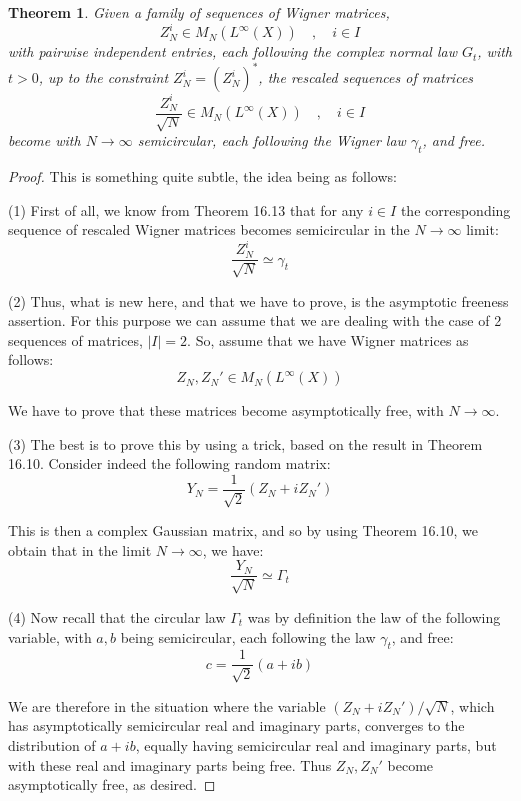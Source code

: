 \documentclass[12pt]{amsbook}
\newtheorem{theorem}{Theorem}[chapter]
\begin{document}

\begin{theorem}
Given a family of sequences of Wigner matrices, 
$$Z^i_N\in M_N(L^\infty(X))\quad,\quad i\in I$$
with pairwise independent entries, each following the complex normal law $G_t$, with $t>0$, up to the constraint $Z_N^i=(Z_N^i)^*$, the rescaled sequences of matrices
$$\frac{Z^i_N}{\sqrt{N}}\in M_N(L^\infty(X))\quad,\quad i\in I$$
become with $N\to\infty$ semicircular, each following the Wigner law $\gamma_t$, and free.
\end{theorem}

\begin{proof}
This is something quite subtle, the idea being as follows:

\medskip

(1) First of all, we know from Theorem 16.13 that for any $i\in I$ the corresponding sequence of rescaled Wigner matrices becomes semicircular in the $N\to\infty$ limit:
$$\frac{Z_N^i}{\sqrt{N}}\simeq\gamma_t$$ 

(2) Thus, what is new here, and that we have to prove, is the asymptotic freeness assertion. For this purpose we can assume that we are dealing with the case of 2 sequences of matrices, $|I|=2$. So, assume that we have Wigner matrices as follows:
$$Z_N,Z_N'\in M_N(L^\infty(X))$$

We have to prove that these matrices become asymptotically free, with $N\to\infty$.

\medskip

(3) The best is to prove this by using a trick, based on the result in Theorem 16.10. Consider indeed the following random matrix:
$$Y_N=\frac{1}{\sqrt{2}}(Z_N+iZ_N')$$

This is then a complex Gaussian matrix, and so by using Theorem 16.10, we obtain that in the limit $N\to\infty$, we have:
$$\frac{Y_N}{\sqrt{N}}\simeq\Gamma_t$$

(4) Now recall that the circular law $\Gamma_t$ was by definition the law of the following variable, with $a,b$ being semicircular, each following the law $\gamma_t$, and free:
$$c=\frac{1}{\sqrt{2}}(a+ib)$$

We are therefore in the situation where the variable $(Z_N+iZ_N')/\sqrt{N}$, which has asymptotically semicircular real and imaginary parts, converges to the distribution of $a+ib$, equally having semicircular real and imaginary parts, but with these real and imaginary parts being free. Thus $Z_N,Z_N'$ become asymptotically free, as desired.
\end{proof}
\end{document}
